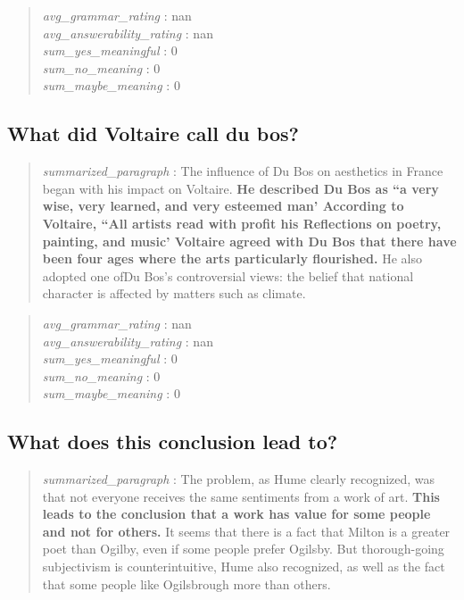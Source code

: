 \begin{quote}
\emph{avg\_grammar\_rating} : nan\\
\emph{avg\_answerability\_rating} : nan\\
\emph{sum\_yes\_meaningful} : 0\\
\emph{sum\_no\_meaning} : 0\\
\emph{sum\_maybe\_meaning} : 0
\end{quote}

\hypertarget{what-did-voltaire-call-du-bos}{%
\subsection{What did Voltaire call du
bos?}\label{what-did-voltaire-call-du-bos}}

\begin{quote}
\emph{summarized\_paragraph} : The influence of Du Bos on aesthetics in
France began with his impact on Voltaire. \textbf{He described Du Bos as
``a very wise, very learned, and very esteemed man' According to
Voltaire, ``All artists read with profit his Reflections on poetry,
painting, and music' Voltaire agreed with Du Bos that there have been
four ages where the arts particularly flourished.} He also adopted one
ofDu Bos's controversial views: the belief that national character is
affected by matters such as climate.
\end{quote}

\begin{quote}
\emph{avg\_grammar\_rating} : nan\\
\emph{avg\_answerability\_rating} : nan\\
\emph{sum\_yes\_meaningful} : 0\\
\emph{sum\_no\_meaning} : 0\\
\emph{sum\_maybe\_meaning} : 0
\end{quote}

\hypertarget{what-does-this-conclusion-lead-to}{%
\subsection{What does this conclusion lead
to?}\label{what-does-this-conclusion-lead-to}}

\begin{quote}
\emph{summarized\_paragraph} : The problem, as Hume clearly recognized,
was that not everyone receives the same sentiments from a work of art.
\textbf{This leads to the conclusion that a work has value for some
people and not for others.} It seems that there is a fact that Milton is
a greater poet than Ogilby, even if some people prefer Ogilsby. But
thorough-going subjectivism is counterintuitive, Hume also recognized,
as well as the fact that some people like Ogilsbrough more than others.
\end{quote}

